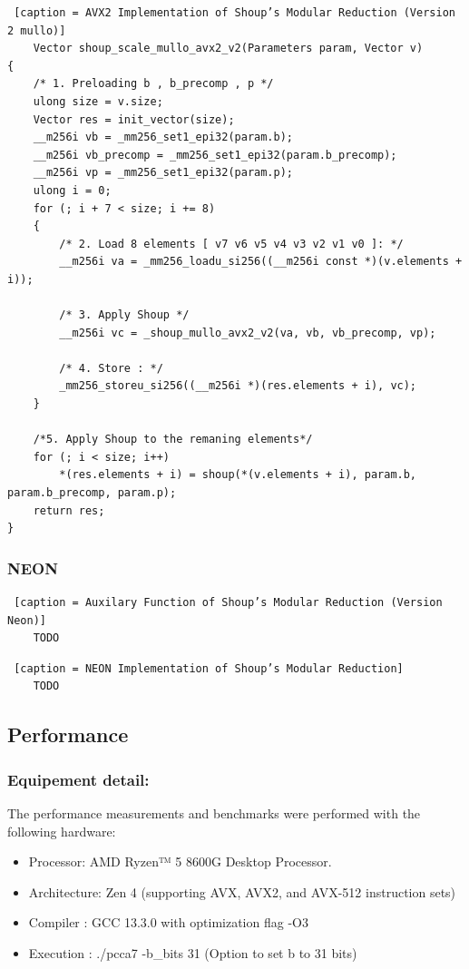 \documentclass{article}
\begin{document}
\begin{lstlisting} [caption = AVX2 Implementation of Shoup’s Modular Reduction (Version 2 mullo)]
    Vector shoup_scale_mullo_avx2_v2(Parameters param, Vector v)
{
    /* 1. Preloading b , b_precomp , p */
    ulong size = v.size;
    Vector res = init_vector(size);
    __m256i vb = _mm256_set1_epi32(param.b);
    __m256i vb_precomp = _mm256_set1_epi32(param.b_precomp);
    __m256i vp = _mm256_set1_epi32(param.p);
    ulong i = 0;
    for (; i + 7 < size; i += 8)
    {
        /* 2. Load 8 elements [ v7 v6 v5 v4 v3 v2 v1 v0 ]: */
        __m256i va = _mm256_loadu_si256((__m256i const *)(v.elements + i));

        /* 3. Apply Shoup */
        __m256i vc = _shoup_mullo_avx2_v2(va, vb, vb_precomp, vp);

        /* 4. Store : */
        _mm256_storeu_si256((__m256i *)(res.elements + i), vc);
    }

    /*5. Apply Shoup to the remaning elements*/
    for (; i < size; i++)
        *(res.elements + i) = shoup(*(v.elements + i), param.b, param.b_precomp, param.p);
    return res;
}

\end{lstlisting}


\subsubsection{NEON}
\begin{lstlisting} [caption = Auxilary Function of Shoup’s Modular Reduction (Version Neon)]
    TODO
\end{lstlisting}
\begin{lstlisting} [caption = NEON Implementation of Shoup’s Modular Reduction]
    TODO
\end{lstlisting}
\subsection{Performance}
\subsubsection{Equipement detail:}
The performance measurements and benchmarks were performed with the following hardware:
\begin{itemize}
    \item Processor: AMD Ryzen™ 5 8600G Desktop Processor.
    \item Architecture: Zen 4 (supporting AVX, AVX2, and AVX-512 instruction sets)
    \item Compiler : GCC 13.3.0 with optimization flag -O3
    \item Execution : ./pcca7 -b\_bits 31 (Option to set b to 31 bits)
\end{itemize}
\end{document}
